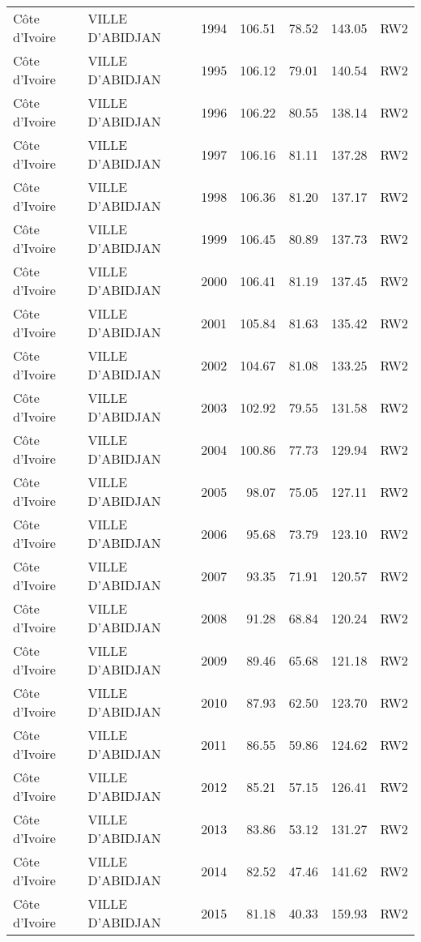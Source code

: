 \begin{longtable}{lllrrrl}
  C\^{o}te d'Ivoire & VILLE D'ABIDJAN & 1994 & 106.51 & 78.52 & 143.05 & RW2 \\ 
  C\^{o}te d'Ivoire & VILLE D'ABIDJAN & 1995 & 106.12 & 79.01 & 140.54 & RW2 \\ 
  C\^{o}te d'Ivoire & VILLE D'ABIDJAN & 1996 & 106.22 & 80.55 & 138.14 & RW2 \\ 
  C\^{o}te d'Ivoire & VILLE D'ABIDJAN & 1997 & 106.16 & 81.11 & 137.28 & RW2 \\ 
  C\^{o}te d'Ivoire & VILLE D'ABIDJAN & 1998 & 106.36 & 81.20 & 137.17 & RW2 \\ 
  C\^{o}te d'Ivoire & VILLE D'ABIDJAN & 1999 & 106.45 & 80.89 & 137.73 & RW2 \\ 
  C\^{o}te d'Ivoire & VILLE D'ABIDJAN & 2000 & 106.41 & 81.19 & 137.45 & RW2 \\ 
  C\^{o}te d'Ivoire & VILLE D'ABIDJAN & 2001 & 105.84 & 81.63 & 135.42 & RW2 \\ 
  C\^{o}te d'Ivoire & VILLE D'ABIDJAN & 2002 & 104.67 & 81.08 & 133.25 & RW2 \\ 
  C\^{o}te d'Ivoire & VILLE D'ABIDJAN & 2003 & 102.92 & 79.55 & 131.58 & RW2 \\ 
  C\^{o}te d'Ivoire & VILLE D'ABIDJAN & 2004 & 100.86 & 77.73 & 129.94 & RW2 \\ 
  C\^{o}te d'Ivoire & VILLE D'ABIDJAN & 2005 & 98.07 & 75.05 & 127.11 & RW2 \\ 
  C\^{o}te d'Ivoire & VILLE D'ABIDJAN & 2006 & 95.68 & 73.79 & 123.10 & RW2 \\ 
  C\^{o}te d'Ivoire & VILLE D'ABIDJAN & 2007 & 93.35 & 71.91 & 120.57 & RW2 \\ 
  C\^{o}te d'Ivoire & VILLE D'ABIDJAN & 2008 & 91.28 & 68.84 & 120.24 & RW2 \\ 
  C\^{o}te d'Ivoire & VILLE D'ABIDJAN & 2009 & 89.46 & 65.68 & 121.18 & RW2 \\ 
  C\^{o}te d'Ivoire & VILLE D'ABIDJAN & 2010 & 87.93 & 62.50 & 123.70 & RW2 \\ 
  C\^{o}te d'Ivoire & VILLE D'ABIDJAN & 2011 & 86.55 & 59.86 & 124.62 & RW2 \\ 
  C\^{o}te d'Ivoire & VILLE D'ABIDJAN & 2012 & 85.21 & 57.15 & 126.41 & RW2 \\ 
  C\^{o}te d'Ivoire & VILLE D'ABIDJAN & 2013 & 83.86 & 53.12 & 131.27 & RW2 \\ 
  C\^{o}te d'Ivoire & VILLE D'ABIDJAN & 2014 & 82.52 & 47.46 & 141.62 & RW2 \\ 
  C\^{o}te d'Ivoire & VILLE D'ABIDJAN & 2015 & 81.18 & 40.33 & 159.93 & RW2 \\ 

\end{longtable}
